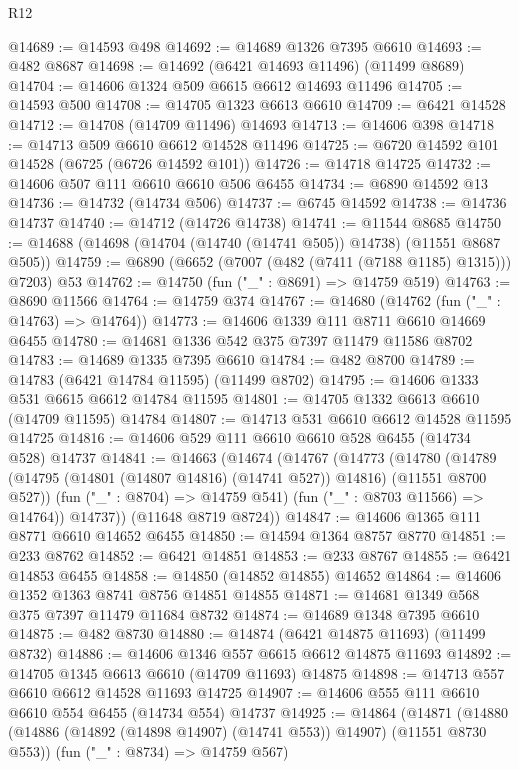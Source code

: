 \begin{lexlean}{R12}
\begin{coremodule}
@14689 := @14593 @498
@14692 := @14689 @1326 @7395 @6610
@14693 := @482 @8687
@14698 := @14692 (@6421 @14693 @11496) (@11499 @8689)
@14704 := @14606 @1324 @509 @6615 @6612 @14693 @11496
@14705 := @14593 @500
@14708 := @14705 @1323 @6613 @6610
@14709 := @6421 @14528
@14712 := @14708 (@14709 @11496) @14693
@14713 := @14606 @398
@14718 := @14713 @509 @6610 @6612 @14528 @11496
@14725 := @6720 @14592 @101 @14528 (@6725 (@6726 @14592 @101))
@14726 := @14718 @14725
@14732 := @14606 @507 @111 @6610 @6610 @506 @6455
@14734 := @6890 @14592 @13
@14736 := @14732 (@14734 @506)
@14737 := @6745 @14592
@14738 := @14736 @14737
@14740 := @14712 (@14726 @14738)
@14741 := @11544 @8685
@14750 := @14688 (@14698 (@14704 (@14740 (@14741 @505)) @14738) (@11551 @8687 @505))
@14759 := @6890 (@6652 (@7007 (@482 (@7411 (@7188 @1185) @1315))) @7203) @53
@14762 := @14750 (fun ("_" : @8691) => @14759 @519)
@14763 := @8690 @11566
@14764 := @14759 @374
@14767 := @14680 (@14762 (fun ("_" : @14763) => @14764))
@14773 := @14606 @1339 @111 @8711 @6610 @14669 @6455
@14780 := @14681 @1336 @542 @375 @7397 @11479 @11586 @8702
@14783 := @14689 @1335 @7395 @6610
@14784 := @482 @8700
@14789 := @14783 (@6421 @14784 @11595) (@11499 @8702)
@14795 := @14606 @1333 @531 @6615 @6612 @14784 @11595
@14801 := @14705 @1332 @6613 @6610 (@14709 @11595) @14784
@14807 := @14713 @531 @6610 @6612 @14528 @11595 @14725
@14816 := @14606 @529 @111 @6610 @6610 @528 @6455 (@14734 @528) @14737
@14841 := @14663
    (@14674
      (@14767
        (@14773
          (@14780
            (@14789 (@14795 (@14801 (@14807 @14816) (@14741 @527)) @14816) (@11551 @8700 @527))
            (fun ("_" : @8704) => @14759 @541)
            (fun ("_" : @8703 @11566) => @14764))
          @14737))
      (@11648 @8719 @8724))
@14847 := @14606 @1365 @111 @8771 @6610 @14652 @6455
@14850 := @14594 @1364 @8757 @8770
@14851 := @233 @8762
@14852 := @6421 @14851
@14853 := @233 @8767
@14855 := @6421 @14853 @6455
@14858 := @14850 (@14852 @14855) @14652
@14864 := @14606 @1352 @1363 @8741 @8756 @14851 @14855
@14871 := @14681 @1349 @568 @375 @7397 @11479 @11684 @8732
@14874 := @14689 @1348 @7395 @6610
@14875 := @482 @8730
@14880 := @14874 (@6421 @14875 @11693) (@11499 @8732)
@14886 := @14606 @1346 @557 @6615 @6612 @14875 @11693
@14892 := @14705 @1345 @6613 @6610 (@14709 @11693) @14875
@14898 := @14713 @557 @6610 @6612 @14528 @11693 @14725
@14907 := @14606 @555 @111 @6610 @6610 @554 @6455 (@14734 @554) @14737
@14925 := @14864
    (@14871
      (@14880 (@14886 (@14892 (@14898 @14907) (@14741 @553)) @14907) (@11551 @8730 @553))
      (fun ("_" : @8734) => @14759 @567)

\end{coremodule}
\end{lexlean}
